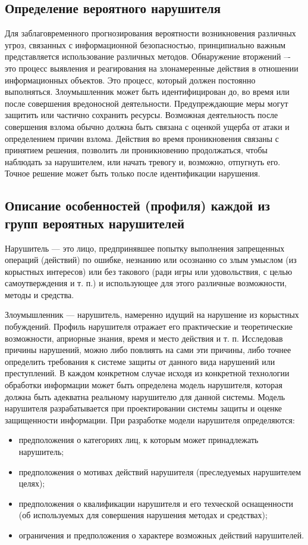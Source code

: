 \subsection{Определение вероятного нарушителя}
\label{subsec:problems:determination}

Для заблаговременного прогнозирования вероятности возникновения различных угроз, связанных с информационной безопасностью, принципиально важным представляется использование различных методов.
Обнаружение вторжений –- это процесс выявления и реагирования на
злонамеренные действия в отношении информационных объектов.
Это процесс, который должен постоянно выполняться.
Злоумышленник может быть идентифицирован до, во время или после совершения вредоносной деятельности.
Предупреждающие меры могут защитить или частично сохранить ресурсы.
Возможная деятельность после совершения взлома обычно должна быть связана с оценкой ущерба от атаки и определением причин взлома.
Действия во время проникновения связаны с принятием решения, позволить ли проникновению продолжаться, чтобы наблюдать за нарушителем, или начать тревогу и, возможно, отпугнуть его.
Точное решение может быть только после идентификации нарушения. \cite{vostrezova_ural}

\subsection{Описание особенностей (профиля) каждой из групп вероятных нарушителей}
\label{subsec:problems:profile}

Нарушитель — это лицо, предпринявшее попытку выполнения запрещенных операций (действий) по ошибке, незнанию или осознанно со злым умыслом (из корыстных интересов) или без такового (ради игры или удовольствия, с целью самоутверждения и т. п.) и использующее для этого различные возможности, методы и средства.

Злоумышленник — нарушитель, намеренно идущий на нарушение из корыстных побуждений.
Профиль нарушителя отражает его практические и теоретические возможности, априорные знания, время и место действия и т. п.
Исследовав причины нарушений, можно либо повлиять на сами эти причины, либо точнее определить требования к системе защиты от данного вида нарушений или преступлений.
В каждом конкретном случае исходя из конкретной технологии обработки информации может быть определена модель нарушителя, которая должна быть адекватна реальному нарушителю для данной системы.
Модель нарушителя разрабатывается при проектировании системы защиты и оценке защищенности информации.
При разработке модели нарушителя определяются:
\begin{itemize}
	\item предположения о категориях лиц, к которым может принадлежать нарушитель;
	\item предположения о мотивах действий нарушителя (преследуемых нарушителем целях);
	\item предположения о квалификации нарушителя и его техческой оснащенности (об используемых для совершения нарушения методах и средствах);
	\item ограничения и предположения о характере возможных действий нарушителей.
\end{itemize}

